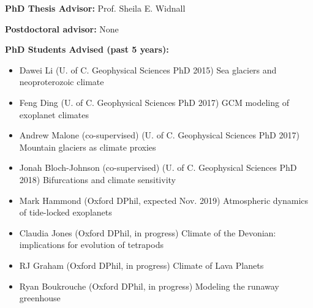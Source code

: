 \documentclass[11pt]{article}
\begin{document}
\begin{bibsection}

    \item \textbf{PhD Thesis Advisor:} Prof. Sheila E. Widnall
    \item \textbf{Postdoctoral advisor:} None
    \item \textbf{PhD Students Advised (past 5 years):} 
         \begin{itemize}
	\item{Dawei Li} (U. of C. Geophysical Sciences PhD 2015)
	            Sea glaciers and neoproterozoic climate
	            
	\item{Feng Ding} (U. of C. Geophysical Sciences PhD 2017)
	            GCM modeling of exoplanet climates
	            
	\item{Andrew Malone} (co-supervised) (U. of C. Geophysical Sciences PhD 2017)
	            Mountain glaciers as climate proxies

     \item{Jonah Bloch-Johnson} (co-supervised) (U. of C. Geophysical Sciences PhD 2018)
                 Bifurcations and climate sensitivity

     \item{Mark Hammond} (Oxford DPhil, expected Nov. 2019) 
                 Atmospheric dynamics of tide-locked exoplanets
 
     \item{Claudia Jones} (Oxford DPhil, in progress) 
                 Climate of the Devonian: implications for
                   evolution of tetrapods

     \item{RJ Graham} (Oxford DPhil, in progress) 
                 Climate of Lava Planets

     \item{Ryan Boukrouche} (Oxford DPhil, in progress) 
                 Modeling the runaway greenhouse


\end{itemize}
\end{bibsection}
\end{document}
